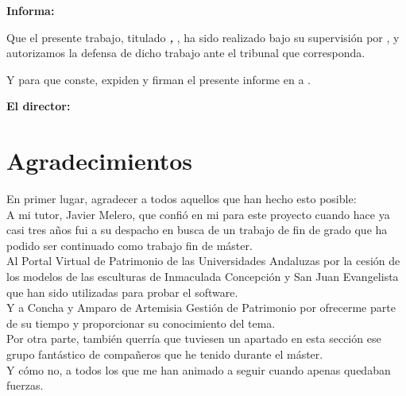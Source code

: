 \vspace{0.5cm}

\textbf{Informa:}

\vspace{0.5cm}

Que el presente trabajo, titulado \textit{\textbf{\myTitle, \mySubtitle}}, ha sido realizado bajo su supervisión por \textbf{\myName}, y autorizamos la defensa de dicho trabajo ante el tribunal que corresponda.

\vspace{0.5cm}

Y para que conste, expiden y firman el presente informe en \myLocation a \myTime.

\vspace{1cm}

\textbf{El director:}

\vspace{5cm}

\noindent \textbf{\myProf}

\chapter*{Agradecimientos}
\thispagestyle{empty}

\vspace{1cm}

En primer lugar, agradecer a todos aquellos que han hecho esto posible: 
\\

A mi tutor, Javier Melero, que confió en mi para este proyecto cuando hace ya casi tres años fui a su despacho en busca de un trabajo de fin de grado que ha podido ser continuado como trabajo fin de máster. 
\\

Al Portal Virtual de Patrimonio de las Universidades Andaluzas por la cesión de los modelos de las esculturas de Inmaculada Concepción y San Juan Evangelista que han sido utilizadas para probar el software. 
\\

Y a Concha y Amparo de Artemisia Gestión de Patrimonio por ofrecerme parte de su tiempo y proporcionar su conocimiento del tema.
\\

Por otra parte, también querría que tuviesen un apartado en esta sección ese grupo fantástico de compañeros que he tenido durante el máster. 
\\

Y cómo no, a todos los que me han animado a seguir cuando apenas quedaban fuerzas.